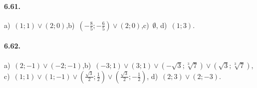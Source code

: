 \paragraph{6.61.} a)~$(1;1)\vee(2;0)$,\quad b)~$\left(-\frac{8}{5};-\frac{6}{5}\right)\vee (2;0)$,\quad c)~$\emptyset$,\quad
d)~$(1;3)$.

\paragraph{6.62.} a)~$(2;-1)\vee(-2;-1)$,\quad b)~$(-3;1)\vee(3;1)\vee\left(-\sqrt{3};\sqrt[3]{7}\right)\vee\left(\sqrt{3};\sqrt[3]{7}\right)$,\protect\\ c)~$(1;1)\vee(1;-1)\vee\left(\frac{\sqrt{3}}{2};\frac{1}{2}\right)\vee\left(\frac{\sqrt{3}}{2};-\frac{1}{2}\right)$,
\quad d)~$(2;3)\vee(2;-3)$.

